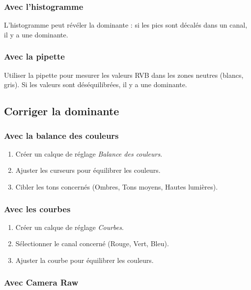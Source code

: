 \subsubsection{Avec l'histogramme}

L'histogramme peut révéler la dominante : si les pics sont décalés dans un canal, il y a une dominante.

\subsubsection{Avec la pipette}

Utiliser la pipette pour mesurer les valeurs RVB dans les zones neutres (blancs, gris). Si les valeurs sont déséquilibrées, il y a une dominante.

\subsection{Corriger la dominante}

\subsubsection{Avec la balance des couleurs}

\begin{enumerate}
    \item Créer un calque de réglage \emph{Balance des couleurs}.
    \item Ajuster les curseurs pour équilibrer les couleurs.
    \item Cibler les tons concernés (Ombres, Tons moyens, Hautes lumières).
\end{enumerate}

\subsubsection{Avec les courbes}

\begin{enumerate}
    \item Créer un calque de réglage \emph{Courbes}.
    \item Sélectionner le canal concerné (Rouge, Vert, Bleu).
    \item Ajuster la courbe pour équilibrer les couleurs.
\end{enumerate}

\subsubsection{Avec Camera Raw}

